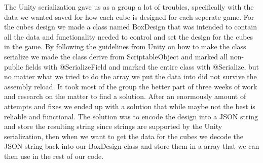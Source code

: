 The Unity serialization gave us as a group a lot of troubles, specifically with the data we wanted saved for how each cube is designed for each seperate game.
For the cubes design we made a class named BoxDesign that was intended to contain all the data and functionality needed to control and set the design for the cubes in the game.
By following the guidelines from Unity on how to make the class serialize we made the class derive from ScriptableObject and marked all non-public fields with @SerializeField and marked the entire class with @Serialize, but no matter what we tried to do the array we put the data into did not survive the assembly reload.
It took most of the group the better part of three weeks of work and research on the matter to find a solution.
 After an enormously amount of attempts and fixes we ended up with a solution that while maybe not the best is reliable and functional. The solution was to encode the design into a JSON string and store the resulting string since strings are supported by the Unity serialization, then when we want to get the data for the cubes we decode the JSON string back into our BoxDesign class and store them in a array that we can then use in the rest of our code.
 